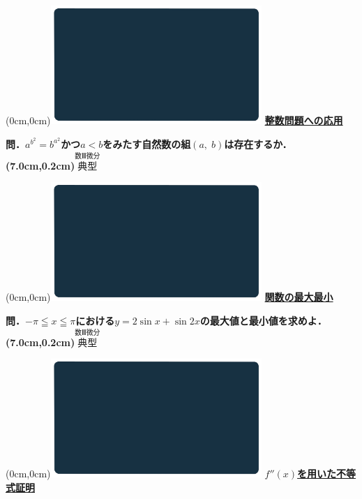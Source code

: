 \documentclass[10pt,
fleqn,
dvipdfmx,
uplatex
]{jsarticle}
\begin{document}
\at(0cm,0cm){\includegraphics[width=8cm,bb=0 0 1920 1080]{./youtube/thumbnails/templates/smart_background/数III微分.jpeg}}
{\color{orange}\bf\boldmath\huge\underline{整数問題への応用}}\vspace{0.3zw}

\huge 
\bf\boldmath 問．$a^{b^2}=b^{a^2}$かつ$a<b$をみたす自然数の組$\left(a,\;b\right)$は存在するか．
\at(7.0cm,0.2cm){\small\color{bradorange}$\overset{\text{数Ⅲ微分}}{\text{典型}}$}


\newpage



\at(0cm,0cm){\includegraphics[width=8cm,bb=0 0 1920 1080]{./youtube/thumbnails/templates/smart_background/数III微分.jpeg}}
{\color{orange}\bf\boldmath\huge\underline{関数の最大最小}}\vspace{0.3zw}

\huge 
\bf\boldmath 問．$-\pi \leqq x\leqq \pi$における$y=2\sin x+\sin 2x$の最大値と最小値を求めよ．
\at(7.0cm,0.2cm){\small\color{bradorange}$\overset{\text{数Ⅲ微分}}{\text{典型}}$}


\newpage



\at(0cm,0cm){\includegraphics[width=8cm,bb=0 0 1920 1080]{./youtube/thumbnails/templates/smart_background/数III微分.jpeg}}
{\color{orange}\bf\boldmath\LARGE\underline{$f''\left(x\right)$を用いた不等式証明}}\vspace{0.3zw}
\end{document}
